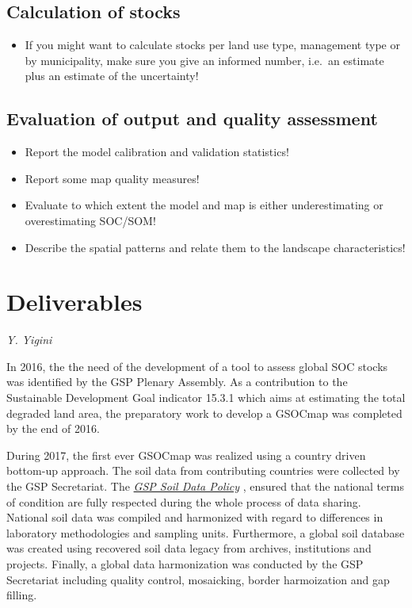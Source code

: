 \documentclass[10pt,b5paper,]{book}
\providecommand{\tightlist}{%
  \setlength{\itemsep}{0pt}\setlength{\parskip}{0pt}}
\theoremstyle{definition}
\theoremstyle{definition}
\theoremstyle{definition}
\theoremstyle{remark}
\begin{document}
\hypertarget{calculation-of-stocks}{%
\section{Calculation of stocks}\label{calculation-of-stocks}}

\begin{itemize}
\tightlist
\item
  If you might want to calculate stocks per land use type, management
  type or by municipality, make sure you give an informed number,
  i.e.~an estimate plus an estimate of the uncertainty!
\end{itemize}

\hypertarget{evaluation-of-output-and-quality-assessment}{%
\section{Evaluation of output and quality
assessment}\label{evaluation-of-output-and-quality-assessment}}

\begin{itemize}
\tightlist
\item
  Report the model calibration and validation statistics!
\item
  Report some map quality measures!
\item
  Evaluate to which extent the model and map is either underestimating
  or overestimating SOC/SOM!
\item
  Describe the spatial patterns and relate them to the landscape
  characteristics!
\end{itemize}

\hypertarget{deliverables}{%
\chapter{Deliverables}\label{deliverables}}

\emph{Y. Yigini}

In 2016, the the need of the development of a tool to assess global SOC
stocks was identified by the GSP Plenary Assembly. As a contribution to
the Sustainable Development Goal indicator 15.3.1 which aims at
estimating the total degraded land area, the preparatory work to develop
a GSOCmap was completed by the end of 2016.

During 2017, the first ever GSOCmap was realized using a country driven
bottom-up approach. The soil data from contributing countries were
collected by the GSP Secretariat. The
\href{http://www.fao.org/3/a-bs975e.pdf}{\emph{GSP Soil Data Policy}}
\citep[see][Chapter 8.5]{gsp_data_2017}, ensured that the national terms
of condition are fully respected during the whole process of data
sharing. National soil data was compiled and harmonized with regard to
differences in laboratory methodologies and sampling units. Furthermore,
a global soil database was created using recovered soil data legacy from
archives, institutions and projects. Finally, a global data
harmonization was conducted by the GSP Secretariat including quality
control, mosaicking, border harmoization and gap filling.
\end{document}
